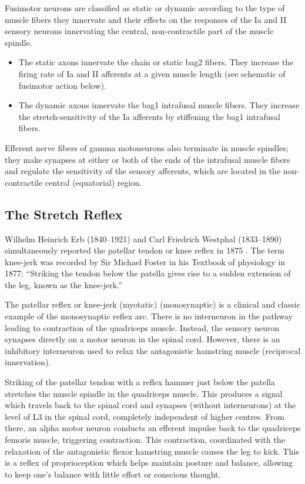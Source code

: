 \documentclass[]{book}
\providecommand{\tightlist}{%
  \setlength{\itemsep}{0pt}\setlength{\parskip}{0pt}}
\begin{document}
Fusimotor neurons are classified as static or dynamic according to the type of muscle fibers they innervate and their effects on the responses of the Ia and II sensory neurons innervating the central, non-contractile part of the muscle spindle.

\begin{itemize}
\tightlist
\item
  The static axons innervate the chain or static bag2 fibers. They increase the firing rate of Ia and II afferents at a given muscle length (see schematic of fusimotor action below).
\item
  The dynamic axons innervate the bag1 intrafusal muscle fibers. They increase the stretch-sensitivity of the Ia afferents by stiffening the bag1 intrafusal fibers.
\end{itemize}

Efferent nerve fibers of gamma motoneurons also terminate in muscle spindles; they make synapses at either or both of the ends of the intrafusal muscle fibers and regulate the sensitivity of the sensory afferents, which are located in the non-contractile central (equatorial) region.

\hypertarget{the-stretch-reflex}{%
\subsection{The Stretch Reflex}\label{the-stretch-reflex}}

Wilhelm Heinrich Erb (1840--1921) and Carl Friedrich Westphal (1833--1890) simultaneously reported the patellar tendon or knee reflex in 1875 . The term knee-jerk was recorded by Sir Michael Foster in his Textbook of physiology in 1877: ``Striking the tendon below the patella gives rise to a sudden extension of the leg, known as the knee-jerk.''

The patellar reflex or knee-jerk (myotatic) (monosynaptic) is a clinical and classic example of the monosynaptic reflex arc. There is no interneuron in the pathway leading to contraction of the quadriceps muscle. Instead, the sensory neuron synapses directly on a motor neuron in the spinal cord. However, there is an inhibitory interneuron used to relax the antagonistic hamstring muscle (reciprocal innervation).

Striking of the patellar tendon with a reflex hammer just below the patella stretches the muscle spindle in the quadriceps muscle. This produces a signal which travels back to the spinal cord and synapses (without interneurons) at the level of L3 in the spinal cord, completely independent of higher centres. From there, an alpha motor neuron conducts an efferent impulse back to the quadriceps femoris muscle, triggering contraction. This contraction, coordinated with the relaxation of the antagonistic flexor hamstring muscle causes the leg to kick. This is a reflex of proprioception which helps maintain posture and balance, allowing to keep one's balance with little effort or conscious thought.
\end{document}
